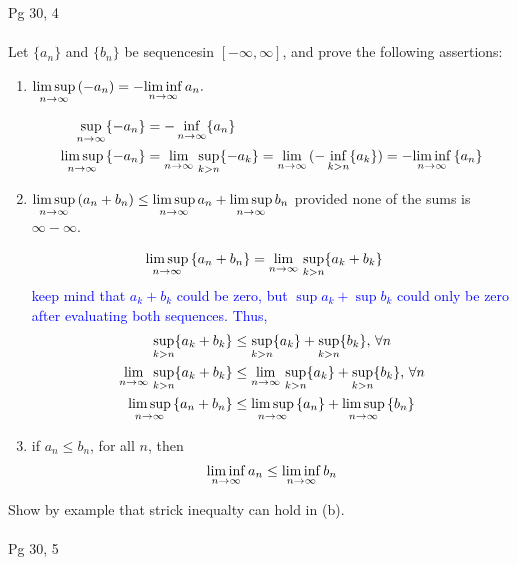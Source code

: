 \documentclass[10pt,a4paper]{report}
\newcommand{\BLUE}[1]{\textcolor{blue}{#1}}
\begin{document}
\HLINE
\noindent Pg 30, 4\\ \\
Let $\{a_n\}$ and $\{b_n\}$ be sequencesin $[-\infty,\infty]$, and prove the following assertions:
\begin{enumerate}[label=(\alph*)]
	\item $ \underset{n\to\infty}\limsup \, (-a_n) = - \underset{n\to\infty}\liminf \, a_n. $
	
	\BLUE{\begin{align*}
			\sup_{n\to\infty} \{ - a_n \} &= - \inf_{n\to \infty} \{a_n\} \\
			\underset{n\to\infty}\limsup \, \{ -a_n\} &= \underset{n \to \infty}\lim\, \sup_{k>n} \{-a_k \} = \underset{n \to \infty}\lim\, (-\inf_{k>n} \{a_k \}) = -\underset{n\to\infty}\liminf \, \{a_n \}
		\end{align*}	
	}
	
	\item $ \underset{n\to\infty}\limsup \, (a_n+b_n) \le \underset{n\to\infty}\limsup \, a_n + \underset{n\to\infty}\limsup \, b_n$ provided none of the sums is $\infty - \infty$.
	
	\BLUE{\begin{align*}
		\underset{n\to\infty}\limsup \, \{a_n + b_n\} &= \underset{n \to \infty}\lim\, \sup_{k>n} \{a_k+b_k\}
	\end{align*}keep mind that $a_k + b_k$ could be zero, but $\sup {a_k} + \sup{b_k}$ could only be zero after evaluating both sequences.  Thus,
	\begin{align*}
		\sup_{k > n} \{a_k + b_k\} &\le \sup_{k>n}\{a_k\} + \sup_{k>n}\{b_k\}, \, \forall n \\
		\underset{n \to \infty}\lim\, \sup_{k > n} \{a_k + b_k\} &\le \underset{n \to \infty}\lim\, \sup_{k>n}\{a_k\} + \sup_{k>n}\{b_k\}, \, \forall n \\
		\underset{n\to\infty}\limsup \, \{a_n + b_n\} &\le \underset{n\to\infty}\limsup \, \{a_n\} + \underset{n\to\infty}\limsup \,\{b_n\} 
	\end{align*}
	}
	
	\item if $a_n \le b_n$, for all $n$, then 
	\begin{align*}
		\underset{n\to\infty}\liminf \, a_n \le \underset{n\to\infty}\liminf \, b_n
	\end{align*}
\end{enumerate}Show by example that strick inequalty can hold in (b).\\ \\
\HLINE
\noindent Pg 30, 5\\
\end{document}
